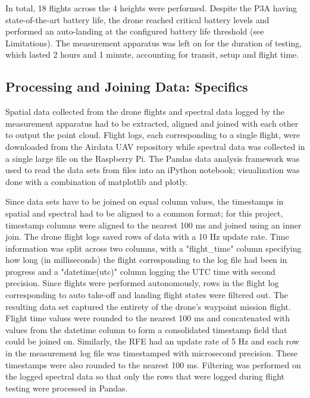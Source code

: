 \documentclass[pageno]{jpaper}
\begin{document}
In total, 18 flights across the 4 heights were performed. Despite the P3A having state-of-the-art battery life, the drone reached critical battery levels and performed an auto-landing at the configured battery life threshold (see Limitations). The measurement apparatus was left on for the duration of testing, which lasted 2 hours and 1 minute, accounting for transit, setup and flight time. 

\subsection{Processing and Joining Data: Specifics}

Spatial data collected from the drone flights and spectral data logged by the measurement apparatus had to be extracted, aligned and joined with each other to output the point cloud. Flight logs, each corresponding to a single flight, were downloaded from the Airdata UAV repository while spectral data was collected in a single large file on the Raspberry Pi. The Pandas data analysis framework was used to read the data sets from files into an iPython notebook; visualization was done with a combination of matplotlib and plotly.

Since data sets have to be joined on equal column values, the timestamps in spatial and spectral had to be aligned to a common format; for this project, timestamp columns were aligned to the nearest 100 ms and joined using an inner join. The drone flight logs saved rows of data with a 10 Hz update rate. Time information was split across two columns, with a "flight\_time" column specifying how long (in milliseconds) the flight corresponding to the log file had been in progress and a "datetime(utc)" column logging the UTC time with second precision. Since flights were performed autonomously, rows in the flight log corresponding to auto take-off and landing flight states were filtered out. The resulting data set captured the entirety of the drone's waypoint mission flight. Flight time values were rounded to the nearest 100 ms and concatenated with values from the datetime column to form a consolidated timestamp field that could be joined on. Similarly, the RFE had an update rate of 5 Hz and each row in the measurement log file was timestamped with microsecond precision. These timestamps were also rounded to the nearest 100 ms. Filtering was performed on the logged spectral data so that only the rows that were logged during flight testing were processed in Pandas. 
\end{document}
